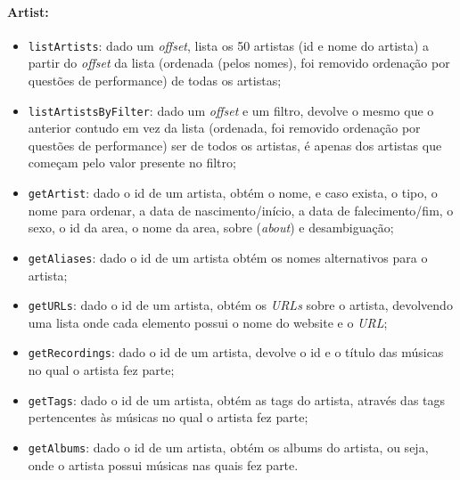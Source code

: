 \documentclass{article}
\begin{document}
\paragraph{\textbf{Artist:}}
    \begin{itemize}
        \item \texttt{listArtists}: dado um \textit{offset}, lista os 50 artistas (id e nome do artista) a partir do \textit{offset} da lista (ordenada (pelos nomes), foi removido ordenação por questões de performance) de todas os artistas;
        \item \texttt{listArtistsByFilter}: dado um \textit{offset} e um filtro, devolve o mesmo que o anterior contudo em vez da lista (ordenada, foi removido ordenação por questões de performance) ser de todos os artistas, é apenas dos artistas que começam pelo valor presente no filtro;
        \item \texttt{getArtist}: dado o id de um artista, obtém o nome, e caso exista, o tipo, o nome para ordenar, a data de nascimento/início, a data de falecimento/fim, o sexo, o id da area, o nome da area, sobre (\textit{about}) e desambiguação;
        \item \texttt{getAliases}: dado o id de um artista obtém os nomes alternativos para o artista;
        \item \texttt{getURLs}: dado o id de um artista, obtém os \textit{URLs} sobre o artista, devolvendo uma lista onde cada elemento possui o nome do website e o \textit{URL};
        \item \texttt{getRecordings}: dado o id de um artista, devolve o id e o título das músicas no qual o artista fez parte;
        \item \texttt{getTags}: dado o id de um artista, obtém as tags do artista, através das tags pertencentes às músicas no qual o artista fez parte;
        \item \texttt{getAlbums}: dado o id de um artista, obtém os albums do artista, ou seja, onde o artista possui músicas nas quais fez parte.
    \end{itemize}
\end{document}
